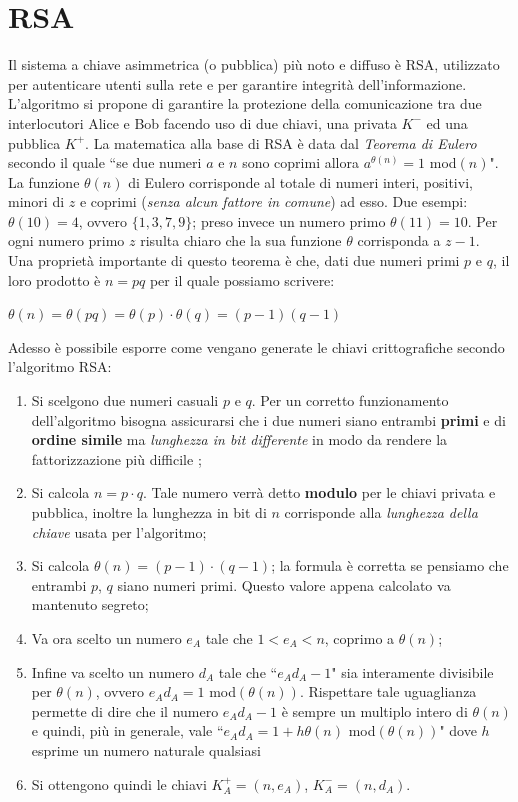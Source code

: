 \documentclass[a4paper,12pt]{tesiinfo}
\begin{document}
\section{RSA}
Il sistema a chiave asimmetrica (o pubblica) pi\`u noto e diffuso \`e RSA, utilizzato per autenticare utenti sulla rete e per garantire integrit\`a dell'informazione. L'algoritmo si propone di garantire la protezione della comunicazione tra due interlocutori Alice e Bob facendo uso di due chiavi, una privata $K^-$ ed una pubblica $K^+$. La matematica alla base di RSA \`e data dal \textit{Teorema di Eulero} secondo il quale ``se due numeri $a$ e $n$ sono coprimi allora $a^{\theta(n)} = 1$ mod$(n)$". La funzione $\theta(n)$ di Eulero corrisponde al totale di numeri interi, positivi, minori di $z$ e coprimi (\emph{senza alcun fattore in comune}) ad esso. Due esempi: $\theta(10) = 4$, ovvero $\{1, 3, 7, 9\}$;  preso invece un numero primo $\theta(11) = 10$. Per ogni numero primo $z$ risulta chiaro che la sua funzione $\theta$ corrisponda a $z-1$. 
\\
Una propriet\`a importante di questo teorema \cite{libro 900 pagine} \`e che, dati due numeri primi $p$ e $q$, il loro prodotto \`e $n=pq$ per il quale possiamo scrivere:
\begin{center}
    $\theta (n) = \theta (pq) = \theta (p) \cdot \theta (q) = (p-1)(q-1)$
\end{center}
Adesso \`e possibile esporre come vengano generate le chiavi crittografiche secondo l'algoritmo RSA:
\begin{enumerate}
 \item Si scelgono due numeri casuali $p$ e $q$. Per un corretto funzionamento dell'algoritmo bisogna assicurarsi che i due numeri siano entrambi \textbf{primi} e di \textbf{ordine simile} ma \textit{lunghezza in bit differente} in modo da rendere la fattorizzazione pi\`u difficile \cite{RSAp+q};
 \item Si calcola $n=p \cdot q$. Tale numero verr\`a detto \textbf{modulo} per le chiavi privata e pubblica, inoltre la lunghezza in bit di $n$ corrisponde alla \textit{lunghezza della chiave} usata per l'algoritmo;
 \item Si calcola $\theta(n) = (p-1)\cdot (q-1)$; la formula \`e corretta se pensiamo che entrambi $p$, $q$ siano numeri primi. Questo valore appena calcolato va mantenuto segreto;
 \item Va ora scelto un numero $e_A$ tale che $ 1<e_A<n$, coprimo a $\theta(n)$;
 \item Infine va scelto un numero $d_A$ tale che ``$e_Ad_A-1$" sia interamente divisibile per $\theta(n)$, ovvero $e_Ad_A= 1$ mod$(\theta(n)) $. Rispettare tale uguaglianza permette di dire che il numero $e_Ad_A -1$ \`e sempre un multiplo intero di $\theta(n)$ e quindi, pi\`u in generale, vale ``$e_Ad_A = 1 + h\theta(n) $ mod$(\theta(n)) $" dove $h$ esprime un numero naturale qualsiasi
 \item Si ottengono quindi le chiavi $K_A^+ = (n, e_A)$, $K_A^- = (n, d_A)$.
\end{enumerate}
\end{document}
